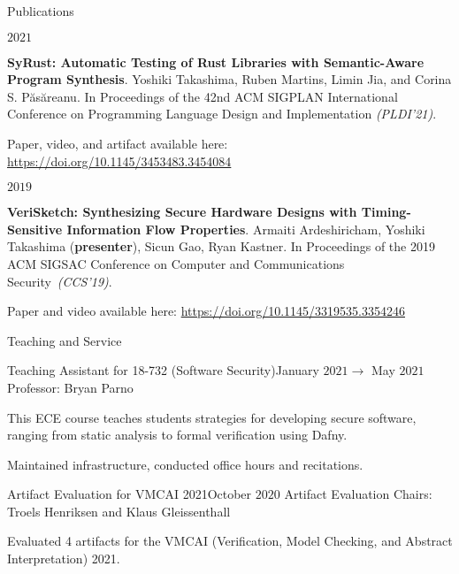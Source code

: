 \documentclass{resume} %
\begin{document}
\begin{rSection}{Publications}

  \begin{rSubsection}{}{$2021$}{}{}
  \item \textbf{SyRust: Automatic Testing of Rust Libraries
    with Semantic-Aware Program Synthesis}.
    Yoshiki Takashima, Ruben Martins, Limin Jia, and Corina
    S. P\u{a}s\u{a}reanu.  In Proceedings of the 42nd
    ACM SIGPLAN International Conference on Programming Language
    Design and Implementation \textit{(PLDI’21)}.

    Paper, video, and artifact available here:
    \href{https://doi.org/10.1145/3453483.3454084}
    {https://doi.org/10.1145/3453483.3454084}
  \end{rSubsection}

  \begin{rSubsection}{}{$2019$}{}{}
  \item \textbf{VeriSketch: Synthesizing Secure Hardware Designs with
      Timing-Sensitive Information Flow Properties}.  Armaiti
    Ardeshiricham, Yoshiki Takashima (\textbf{presenter}), Sicun Gao,
    Ryan Kastner. In Proceedings of the 2019 ACM SIGSAC Conference on
    Computer and Communications Security~\textit{(CCS'19)}.

    Paper and video available here:
    \href{https://dl.acm.org/doi/abs/10.1145/3319535.3354246}
    {https://doi.org/10.1145/3319535.3354246}
  \end{rSubsection}
\end{rSection}

\begin{rSection}{Teaching and Service}

  \begin{rSubsection}{Teaching Assistant for 18-732 (Software Security)}{January $2021
      \rightarrow$ May $2021$}{Professor: Bryan Parno}{}
  \item This ECE course teaches students strategies for developing secure
    software, ranging from static analysis to formal verification using Dafny.
  \item Maintained infrastructure, conducted office hours and recitations.
  \end{rSubsection}

  \begin{rSubsection}{Artifact Evaluation for VMCAI 2021}{October $2020$}
    {Artifact Evaluation Chairs: Troels Henriksen and Klaus Gleissenthall}{}
  \item Evaluated 4 artifacts for the VMCAI (Verification, Model
    Checking, and Abstract Interpretation) 2021.
  \end{rSubsection}
\end{rSection}
\end{document}
